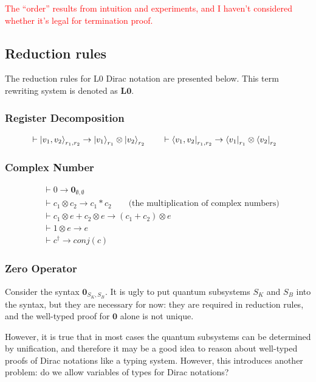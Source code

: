 \documentclass{article}
\begin{document}
\textcolor{red}{The ``order'' results from intuition and experiments, and I haven't considered whether it's legal for termination proof.}

\subsection{Reduction rules}
The reduction rules for L0 Dirac notation are presented below. This term rewriting system is denoted as $\textbf{L0}$.


\subsubsection*{Register Decomposition}
\begin{align*}
  & \vdash \ket{v_1, v_2}_{r_1, r_2} \to \ket{v_1}_{r_1} \otimes \ket{v_2}_{r_2} \qquad \vdash \bra{v_1, v_2}_{r_1, r_2} \to \bra{v_1}_{r_1} \otimes \bra{v_2}_{r_2} 
\end{align*}

\subsubsection*{Complex Number}
\begin{align*}
  & \vdash 0 \to \textbf{0}_{\emptyset, \emptyset}\\
  & \vdash c_1 \otimes c_2 \to c_1 * c_2\qquad \text{(the multiplication of complex numbers)}\\
  & \vdash c_1 \otimes e + c_2 \otimes e \to (c_1 + c_2) \otimes e\\
  & \vdash 1 \otimes e \to e\\
  & \vdash c^\dagger \to conj(c)
\end{align*}

\subsubsection*{Zero Operator}
Consider the syntax $\textbf{0}_{S_K, S_B}$. It is ugly to put quantum subsystems $S_K$ and $S_B$ into the syntax, but they are necessary for now: they are required in reduction rules, and the well-typed proof for $\textbf{0}$ alone is not unique.

However, it is true that in most cases the quantum subsystems can be determined by unification, and therefore it may be a good idea to reason about well-typed proofs of Dirac notations like a typing system. However, this introduces another problem: do we allow variables of types for Dirac notations?
\end{document}
